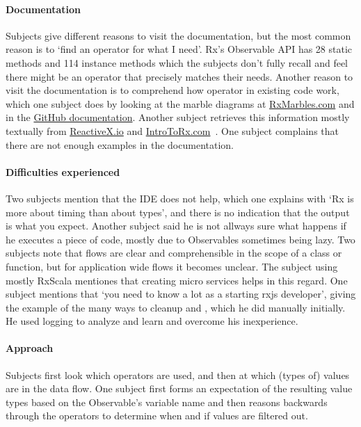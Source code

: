 \paragraph{Documentation}
Subjects give different reasons to visit the documentation, but the most common reason is to `find an operator for what I need'. Rx's Observable API has 28 static methods and 114 instance methods which the subjects don't fully recall and feel there might be an operator that precisely matches their needs. Another reason to visit the documentation is to comprehend how operator in existing code work, which one subject does by looking at the marble diagrams at \href{http://rxmarbles.com}{RxMarbles.com} and in the \href{https://github.com/Reactive-Extensions/RxJS/blob/master/doc/}{GitHub documentation}. Another subject retrieves this information mostly textually from \href{http://reactivex.io/rxjs}{ReactiveX.io} and \href{http://introtorx.com}{IntroToRx.com}~\cite{introtorx}. One subject complains that there are not enough examples in the documentation.

\paragraph{Difficulties experienced}
Two subjects mention that the IDE does not help, which one explains with `Rx is more about timing than about types', and there is no indication that the output is what you expect. Another subject said he is not allways sure what happens if he executes a piece of code, mostly due to Observables sometimes being lazy.
Two subjects note that flows are clear and comprehensible in the scope of a class or function, but for application wide flows it becomes unclear. The subject using mostly RxScala mentiones that creating micro services helps in this regard. 
One subject mentions that `you need to know a lot as a starting {\lbrack}rxjs{\rbrack} developer', giving the example of the many ways to cleanup and , which he did manually initially. He used logging to analyze and learn and overcome his inexperience. 

\paragraph{Approach}
Subjects first look which operators are used, and then at which (types of) values are in the data flow. One subject first forms an expectation of the resulting value types based on the Observable's variable name and then reasons backwards through the operators to determine when and if values are filtered out.

